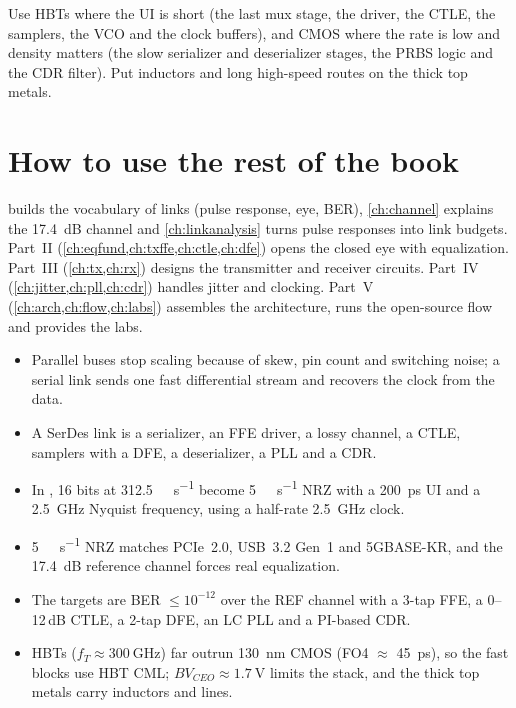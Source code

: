 \begin{insight}
Use HBTs where the UI is short (the last mux stage, the driver, the CTLE, the samplers, the VCO and the clock buffers), and CMOS where the rate is low and density matters (the slow serializer and deserializer stages, the PRBS logic and the CDR filter). Put inductors and long high-speed routes on the thick top metals.
\end{insight}

\section{How to use the rest of the book}\label{sec:ch1-roadmap}
 builds the vocabulary of links (pulse response, eye, BER), \cref{ch:channel} explains the \qty{17.4}{\deci\bel} channel and \cref{ch:linkanalysis} turns pulse responses into link budgets. Part~II (\cref{ch:eqfund,ch:txffe,ch:ctle,ch:dfe}) opens the closed eye with equalization. Part~III (\cref{ch:tx,ch:rx}) designs the transmitter and receiver circuits. Part~IV (\cref{ch:jitter,ch:pll,ch:cdr}) handles jitter and clocking. Part~V (\cref{ch:arch,ch:flow,ch:labs}) assembles the architecture, runs the open-source flow and provides the labs.

\begin{takeaways}
\begin{itemize}
  \item Parallel buses stop scaling because of skew, pin count and switching noise; a serial link sends one fast differential stream and recovers the clock from the data.
  \item A SerDes link is a serializer, an FFE driver, a lossy channel, a CTLE, samplers with a DFE, a deserializer, a PLL and a CDR.
  \item In \OS{}, 16 bits at \qty{312.5}{\mega\bit\per\second} become \qty{5}{\giga\bit\per\second} NRZ with a \qty{200}{\pico\second} UI and a \qty{2.5}{\giga\hertz} Nyquist frequency, using a half-rate \qty{2.5}{\giga\hertz} clock.
  \item \qty{5}{\giga\bit\per\second} NRZ matches PCIe~2.0, USB~3.2 Gen~1 and 5GBASE-KR, and the \qty{17.4}{\deci\bel} reference channel forces real equalization.
  \item The targets are BER $\le 10^{-12}$ over the REF channel with a 3-tap FFE, a 0--12\,dB CTLE, a 2-tap DFE, an LC PLL and a PI-based CDR.
  \item \sgx{} HBTs ($f_T \approx \qty{300}{\giga\hertz}$) far outrun \qty{130}{\nano\meter} CMOS (FO4 $\approx$ \qty{45}{\pico\second}), so the fast blocks use HBT CML; $BV_{CEO} \approx \qty{1.7}{\volt}$ limits the stack, and the thick top metals carry inductors and lines.
\end{itemize}
\end{takeaways}
